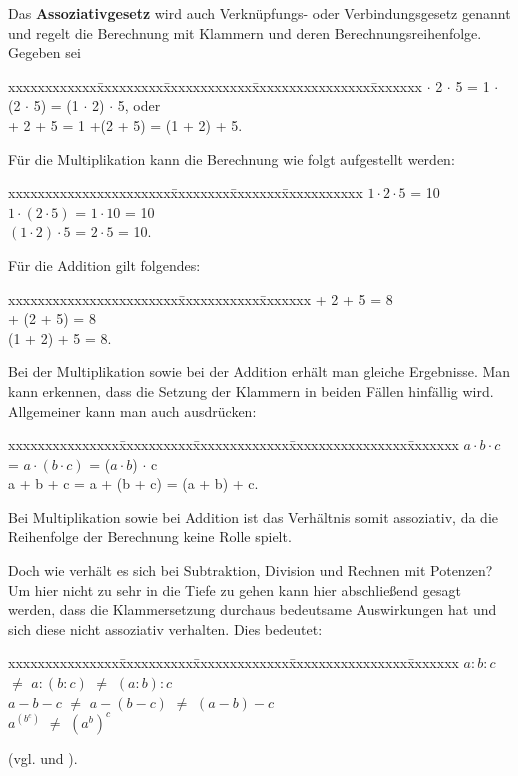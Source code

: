 \documentclass[12pt,a4paper]{article}
\theoremstyle{definition}
\begin{document}
Das \textbf{Assoziativgesetz} wird auch Verknüpfungs- oder Verbindungsgesetz genannt und regelt die Berechnung mit Klammern und deren Berechnungsreihenfolge.
Gegeben sei
\begin{tabbing}
xxxxxxxxxxxx\=xxxxxxxxx\=xxxxxxxxxxxx\=xxxxxxxxxxxxxxxx\=xxxxxxx\kill
{} $\cdot$ 2 $\cdot$ 5 \> = 1 $\cdot$ (2 $\cdot$ 5) \> = (1 $\cdot$ 2) $\cdot$ 5, \> oder \\
 + 2 + 5             \>= 1 +(2 + 5)               \> = (1 + 2) + 5.
\end{tabbing}
Für die Multiplikation kann die Berechnung wie folgt aufgestellt werden:
\begin{tabbing}
xxxxxxxxxxxxxxxxxxxxxx\=xxxxxxxx\=xxxxxxx\=xxxxxxxxxxx\kill
\> $1 \cdot 2 \cdot 5$   \>                \> = 10 \\
\> $1 \cdot (2 \cdot 5)$ \> = $1 \cdot 10$ \> = 10 \\
\> $(1 \cdot 2) \cdot 5$ \> = $2 \cdot 5$  \> = 10.
\end{tabbing}
Für die Addition gilt folgendes:
\begin{tabbing}
xxxxxxxxxxxxxxxxxxxxxxx\=xxxxxxxxxxx\=xxxxxxx\kill
{} + 2 + 5   \> = 8 \\
 + (2 + 5) \> = 8 \\
\> (1 + 2) + 5 \> = 8.
\end{tabbing}
Bei der Multiplikation sowie bei der Addition erhält man gleiche Ergebnisse.
Man kann erkennen, dass die Setzung der Klammern in beiden Fällen hinfällig wird.
Allgemeiner kann man auch ausdrücken:
\begin{tabbing}
xxxxxxxxxxxxxxx\=xxxxxxxxxx\=xxxxxxxxxxxxx\=xxxxxxxxxxxxxxxx\=xxxxxxx\kill
\> $a \cdot b \cdot c$ \> = $a \cdot (b \cdot c)$ \> = ($a \cdot b$) $\cdot$ c \\
\> a + b + c           \> = a + (b + c)           \> = (a + b) + c.
\end{tabbing}
Bei Multiplikation sowie bei Addition ist das Verhältnis somit assoziativ, da die Reihenfolge der Berechnung keine Rolle spielt.

Doch wie verhält es sich bei Subtraktion, Division und Rechnen mit Potenzen?
Um hier nicht zu sehr in die Tiefe zu gehen kann hier abschließend gesagt werden, dass die Klammersetzung durchaus bedeutsame Auswirkungen hat und sich diese nicht assoziativ verhalten.
Dies bedeutet:
\begin{tabbing}
xxxxxxxxxxxxxxx\=xxxxxxxxxx\=xxxxxxxxxxxxx\=xxxxxxxxxxxxxxxx\=xxxxxxx\kill
\> $a : b : c$ \> $\neq$ $a : ( b : c)$ \> $\neq$ $(a : b) : c$ \\
\> $a - b - c$ \> $\neq$ $a - ( b - c)$ \> $\neq$ $(a - b) - c$ \\
\> $a^(b^c)$   \> $\neq$ $(a^b)^c$
\end{tabbing}
(vgl. \cite[5--7]{Adler2013} und \cite{AssociativityEncyclopediaofMathematics2016}).
\end{document}
